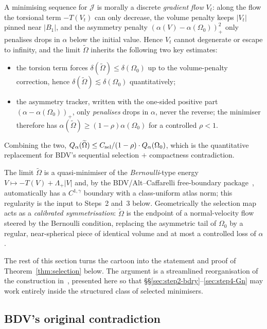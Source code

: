 \documentclass[11pt]{amsart}
\theoremstyle{definition}
\begin{document}
A minimising sequence for $\mathcal{J}$ is morally a discrete
\emph{gradient flow} $V_t$: along the flow the torsional term
$-T(V_t)$ can only decrease, the volume penalty keeps $|V_t|$ pinned
near $|B_1|$, and the asymmetry penalty $(\alpha(V)-\alpha(\Omega_0))
_+^2$ only penalises drops in $\alpha$ below the initial value.  Hence
$V_t$ cannot degenerate or escape to infinity, and the limit
$\widetilde\Omega$ inherits the following two key estimates:

\begin{itemize}[leftmargin=2em]
\item the torsion term forces
$\delta(\widetilde\Omega)\le\delta(\Omega_0)$ up to the volume-penalty
correction, hence $\delta(\widetilde\Omega)\lesssim\delta(\Omega_0)$
quantitatively;
\item the asymmetry tracker, written with the one-sided positive
part $(\alpha-\alpha(\Omega_0))_+$, only \emph{penalises} drops in
$\alpha$, never the reverse; the minimiser therefore has
$\alpha(\widetilde\Omega)\ge(1-\rho)\alpha(\Omega_0)$ for a
controlled $\rho<1$.
\end{itemize}
Combining the two,
\(Q_\alpha(\widetilde\Omega)\le C_{\rm sel}/(1-\rho)\cdot
Q_\alpha(\Omega_0)\), which is the quantitative replacement for BDV's
sequential selection $+$ compactness contradiction.

The limit $\widetilde\Omega$ is a quasi-minimiser of the
\emph{Bernoulli}-type energy $V\mapsto-T(V)+\Lambda_+|V|$ and, by the
BDV/Alt--Caffarelli free-boundary
package~\cite[Theorem~4.18]{BDV2015}, automatically has a $C^{1,
\gamma}$ boundary with a class-uniform atlas norm; this regularity is
the input to Steps~2 and~3 below.  Geometrically the selection map
acts as a \emph{calibrated symmetrisation}: $\widetilde\Omega$ is the
endpoint of a normal-velocity flow steered by the Bernoulli
condition, replacing the asymmetric tail of $\Omega_0$ by a regular,
near-spherical piece of identical volume and at most a controlled
loss of $\alpha$.

The rest of this section turns the cartoon into the statement and
proof of Theorem~\ref{thm:selection} below.  The argument is a
streamlined reorganisation of the construction
in~\cite[\S4]{BDV2015}, presented here so that
\S\S\ref{sec:step2-bdry}--\ref{sec:step4-Gn} may work entirely inside
the structured class of selected minimisers.

\subsection{BDV's original contradiction}
\end{document}
